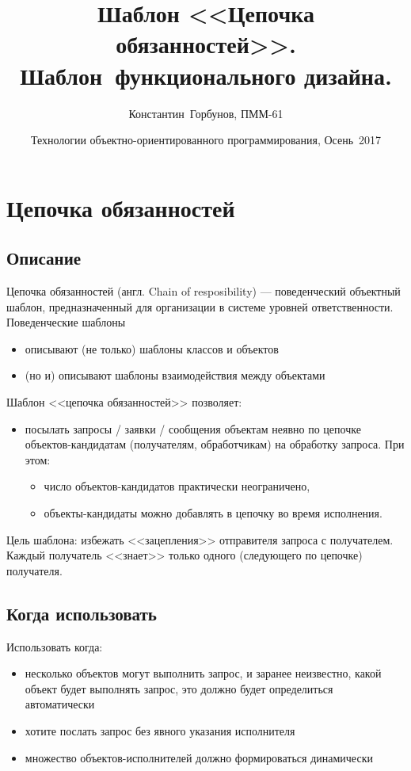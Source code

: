 \documentclass{beamer}
\title[<<Цепочка обязанностей>>. Функциональный дизайн.]
{Шаблон <<Цепочка обязанностей>>. Шаблон~функционального дизайна.}
\author[Константин, Горбунов, ПММ-61]{Константин~Горбунов, ПММ-61}
\date[ТООП 2017]
{Технологии объектно-ориентированного программирования, Осень~2017}
\begin{document}
\frame{\titlepage}

\section{Цепочка обязанностей}
\subsection{Описание}
\begin{frame}
	Цепочка обязанностей (англ. Chain of resposibility) --- поведенческий
	объектный шаблон, предназначенный для организации в системе
	уровней ответственности.
	\medbreak \pause
	Поведенческие шаблоны
	\begin{itemize}
		\item описывают (не только) шаблоны классов и объектов
		\item (но и) описывают шаблоны взаимодействия между объектами
	\end{itemize}
	\medbreak \pause
	
	Шаблон <<цепочка обязанностей>> позволяет:
	\begin{itemize}
		\item посылать запросы / заявки / сообщения объектам неявно по цепочке
		объектов-кандидатам (получателям, обработчикам) на обработку запроса.
		\pause
		При этом:
		\begin{itemize}
			\item число объектов-кандидатов практически неограничено, \pause
			\item объекты-кандидаты можно добавлять в цепочку во время
			исполнения.
		\end{itemize}
	\end{itemize} \pause
	Цель шаблона: избежать <<зацепления>> отправителя запроса с получателем.
	Каждый получатель <<знает>> только одного (следующего по цепочке)
	получателя.
\end{frame}

\subsection{Когда использовать}
\begin{frame}
	Использовать когда: \pause \\
	\begin{itemize}
		\item несколько объектов могут выполнить запрос, и
		заранее неизвестно, какой объект будет выполнять запрос, это
		должно будет определиться автоматически \pause
		\item хотите послать запрос без явного указания исполнителя \pause
		\item множество объектов-исполнителей должно формироваться динамически
	\end{itemize}
\end{frame}
\end{document}

